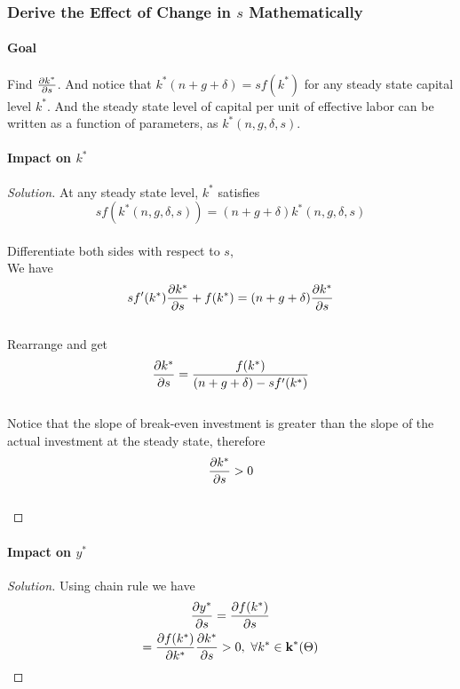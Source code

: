 \documentclass[]{article}
\begin{document}
			\subsubsection{Derive the Effect of Change in $s$ Mathematically}
				\paragraph{Goal} Find $\frac{\partial{k^*}}{\partial{s}}$. And notice that $k^*(n+g+\delta) = sf(k^*)$ for any steady state capital level $k^*$. And the steady state level of capital per unit of effective labor can be written as a function of parameters, as $k^*(n, g, \delta, s)$.
				
			\paragraph{Impact on $k^*$}
			\begin{proof}[Solution]
				At any steady state level, $k^*$ satisfies \\
				\[sf(k^*(n,g,\delta,s)) = (n+g+\delta)k^*(n,g,\delta,s)\] \\
				Differentiate both sides with respect to $s$, \\
				We have \[sf'(k^*)\frac{\partial{k^*}}{\partial{s}} + f(k^*) = (n+g+\delta)\frac{\partial{k^*}}{\partial{s}}\] \\
				Rearrange and get \\
				\[
					\frac{\partial{k^*}}{\partial{s}} = \frac{f(k^*)}{(n+g+\delta) - sf'(k^*)}
				\] \\
				Notice that the slope of break-even investment is greater than the slope of the actual investment at the steady state, therefore \[\frac{\partial{k^*}}{\partial{s}} > 0\] \\
			\end{proof}
			
			\paragraph{Impact on $y^*$}
			\begin{proof}[Solution]
				Using chain rule we have
				\begin{gather*}
					\frac{\partial{y^*}}{\partial{s}} = \frac{\partial{f(k^*)}}{\partial{s}} \\
					= \frac{\partial{f(k^*)}}{\partial{k^*}} \frac{\partial{k^*}}{\partial{s}} > 0,\ \forall k^* \in \textbf{k}^*({\Theta})
				\end{gather*}
			\end{proof}
			
\end{document}
